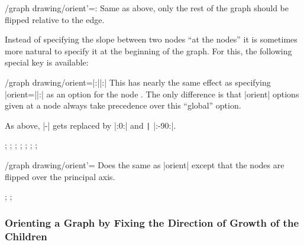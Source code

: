 {\begin{key}{/graph drawing/orient'=:}
  Same as above, only the rest of the graph should be flipped relative
  to the edge.
\end{key}

Instead of specifying the slope between two nodes ``at the nodes'' it 
is sometimes more natural to specify it at the beginning of the
graph. For this, the following special key is available:

\begin{key}{/graph drawing/orient=|:||:|}
  This has nearly the same effect as specifying
  |orient=||:| as an option for the node
  . The only difference is that |orient| options given at
  a node always take precedence over this ``global'' option.

  As above, |-| gets replaced by
  |:0:| and \verb!|!
  |:-90:|.
\begin{codeexample}[]
\tikz {};
\tikz {};
\tikz {};
\tikz {};
\tikz {};
\tikz {};
\tikz {};
\end{codeexample}
\end{key}

\begin{key}{/graph drawing/orient'=}
  Does the same as |orient| except that the nodes are flipped over the
  principal axis.
\begin{codeexample}[]
\tikz {};
\tikz {};
\end{codeexample}
\end{key}



\subsubsection{Orienting a Graph by Fixing the Direction of Growth of the Children}

}
